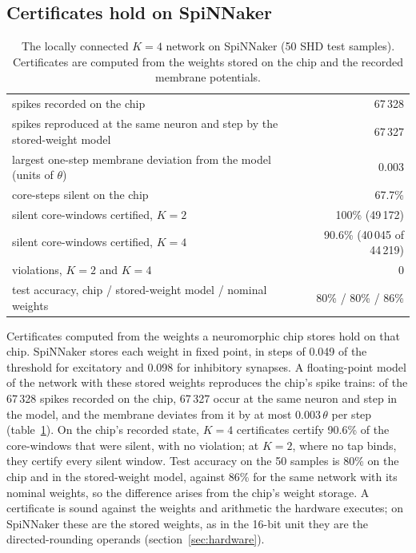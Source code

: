 \documentclass{iopjournal}
\begin{document}
\subsection{Certificates hold on SpiNNaker}
\label{sec:spinnaker}

\begin{table}
\caption{\label{tab:spinnaker}The locally connected $K=4$ network on SpiNNaker (50 SHD test samples). Certificates are computed from the weights stored on the chip and the recorded membrane potentials.}
\centering
\begin{tabular}{lr}
\hline
spikes recorded on the chip & 67\,328 \\
spikes reproduced at the same neuron and step by the stored-weight model & 67\,327 \\
largest one-step membrane deviation from the model (units of $\theta$) & 0.003 \\
core-steps silent on the chip & 67.7\% \\
silent core-windows certified, $K=2$ & 100\% (49\,172) \\
silent core-windows certified, $K=4$ & 90.6\% (40\,045 of 44\,219) \\
violations, $K=2$ and $K=4$ & 0 \\
test accuracy, chip / stored-weight model / nominal weights & 80\% / 80\% / 86\% \\
\hline
\end{tabular}
\end{table}

Certificates computed from the weights a neuromorphic chip stores hold on that chip. SpiNNaker stores each weight in fixed point, in steps of 0.049 of the threshold for excitatory and 0.098 for inhibitory synapses. A floating-point model of the network with these stored weights reproduces the chip's spike trains: of the 67\,328 spikes recorded on the chip, 67\,327 occur at the same neuron and step in the model, and the membrane deviates from it by at most $0.003\,\theta$ per step (table~\ref{tab:spinnaker}). On the chip's recorded state, $K=4$ certificates certify 90.6\% of the core-windows that were silent, with no violation; at $K=2$, where no tap binds, they certify every silent window. Test accuracy on the 50 samples is 80\% on the chip and in the stored-weight model, against 86\% for the same network with its nominal weights, so the difference arises from the chip's weight storage. A certificate is sound against the weights and arithmetic the hardware executes; on SpiNNaker these are the stored weights, as in the 16-bit unit they are the directed-rounding operands (section~\ref{sec:hardware}).
\end{document}
